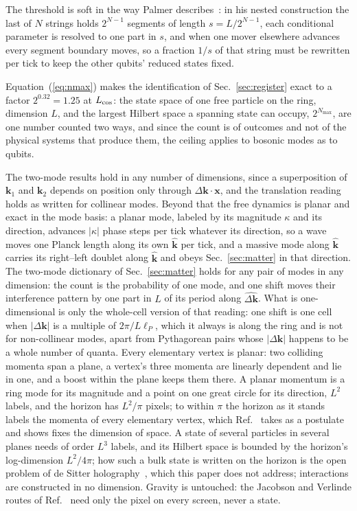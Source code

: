 \documentclass[aps,prd,twocolumn,superscriptaddress,nofootinbib]{revtex4-2}
\begin{document}
The threshold is soft in the way Palmer describes~\cite{palmer2026}: in his nested construction the last of $N$ strings holds $2^{N-1}$ segments of length $s = L/2^{N-1}$, each conditional parameter is resolved to one part in $s$, and when one mover elsewhere advances every segment boundary moves, so a fraction $1/s$ of that string must be rewritten per tick to keep the other qubits' reduced states fixed.

Equation~(\ref{eq:nmax}) makes the identification of Sec.~\ref{sec:register} exact to a factor $2^{0.32} = 1.25$ at $L_{\rm cos}$: the state space of one free particle on the ring, dimension $L$, and the largest Hilbert space a spanning state can occupy, $2^{N_{\max}}$, are one number counted two ways, and since the count is of outcomes and not of the physical systems that produce them, the ceiling applies to bosonic modes as to qubits.

The two-mode results hold in any number of dimensions, since a superposition of $\mathbf{k}_1$ and $\mathbf{k}_2$ depends on position only through $\Delta\mathbf{k}\cdot\mathbf{x}$, and the translation reading holds as written for collinear modes. Beyond that the free dynamics is planar and exact in the mode basis: a planar mode, labeled by its magnitude $\kappa$ and its direction, advances $|\kappa|$ phase steps per tick whatever its direction, so a wave moves one Planck length along its own $\hat{\mathbf{k}}$ per tick, and a massive mode along $\hat{\mathbf{k}}$ carries its right--left doublet along $\hat{\mathbf{k}}$ and obeys Sec.~\ref{sec:matter} in that direction. The two-mode dictionary of Sec.~\ref{sec:matter} holds for any pair of modes in any dimension: the count is the probability of one mode, and one shift moves their interference pattern by one part in $L$ of its period along $\hat{\Delta\mathbf{k}}$. What is one-dimensional is only the whole-cell version of that reading: one shift is one cell when $|\Delta\mathbf{k}|$ is a multiple of $2\pi/L\ell_P$, which it always is along the ring and is not for non-collinear modes, apart from Pythagorean pairs whose $|\Delta\mathbf{k}|$ happens to be a whole number of quanta. Every elementary vertex is planar: two colliding momenta span a plane, a vertex's three momenta are linearly dependent and lie in one, and a boost within the plane keeps them there. A planar momentum is a ring mode for its magnitude and a point on one great circle for its direction, $L^2$ labels, and the horizon has $L^2/\pi$ pixels; to within $\pi$ the horizon as it stands labels the momenta of every elementary vertex, which Ref.~\cite{korytko2026d} takes as a postulate and shows fixes the dimension of space. A state of several particles in several planes needs of order $L^3$ labels, and its Hilbert space is bounded by the horizon's log-dimension $L^2/4\pi$; how such a bulk state is written on the horizon is the open problem of de Sitter holography~\cite{bousso1999,banksfischler2001,parikh2003}, which this paper does not address; interactions are constructed in no dimension. Gravity is untouched: the Jacobson and Verlinde routes of Ref.~\cite{korytko2026} need only the pixel on every screen, never a state.
\end{document}
